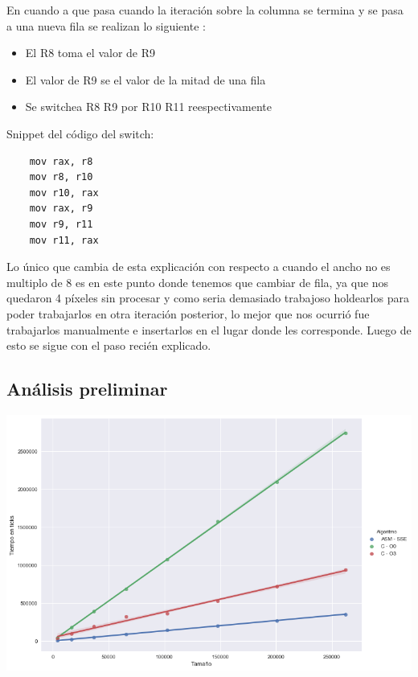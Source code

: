 En cuando a que pasa cuando la iteración sobre la columna se termina y se pasa a una nueva fila se realizan lo siguiente :
\begin{itemize}

\item El R8 toma el valor de R9

\item El valor de R9 se el valor de la mitad de una fila 

\item Se switchea R8 R9 por R10 R11 reespectivamente
\end{itemize}

Snippet del código del switch:

\begin{lstlisting}
	mov rax, r8
	mov r8, r10
	mov r10, rax
	mov rax, r9
	mov r9, r11
	mov r11, rax
\end{lstlisting}

Lo único que cambia de esta explicación con respecto a cuando el ancho no es multiplo de 8 es en este punto donde tenemos que cambiar de fila, ya que nos quedaron 4 píxeles sin procesar y como seria demasiado trabajoso holdearlos para poder trabajarlos en otra iteración posterior, lo mejor que nos ocurrió fue trabajarlos manualmente e insertarlos en el lugar donde les corresponde. Luego de esto se sigue con el paso recién explicado.


\subsection{Análisis preliminar}

\begin{center}
	\includegraphics[scale=0.5]{img/fourCombine_CvsASMvsO3.png}
\end{center}

